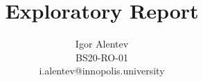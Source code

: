 \documentclass{article}
\author{Igor Alentev \\ BS20-RO-01 \\ i.alentev@innopolis.university}
\title{Exploratory Report}
\date{}
\begin{document}
\maketitle

\newpage

\begin{multicols*}{2}
    
    
    

    

\end{multicols*}
\end{document}
